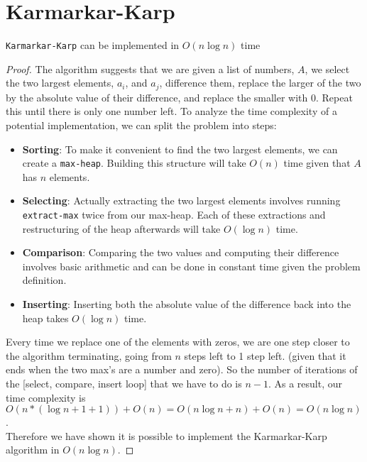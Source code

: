 \documentclass[11pt]{scrartcl}
\theoremstyle{dotlessP}
\theoremstyle{dotlessN}
\theoremstyle{dotN}
\begin{document}
\section{Karmarkar-Karp}
\begin{claim}
    \texttt{Karmarkar-Karp} can be implemented in $O(n\log n)$ time
\end{claim}
\begin{proof}
    The algorithm suggests that we are given a list of numbers, $A$, we select the two largest elements, $a_i$, and $a_j$, difference them, replace the larger of the two by the absolute value of their difference, and replace the smaller with 0. Repeat this until there is only one number left. To analyze the time complexity of a potential implementation, we can split the problem into steps:
    \begin{itemize}
        \item \textbf{Sorting}: To make it convenient to find the two largest elements, we can create a \texttt{max-heap}. Building this structure will take $O(n)$ time given that $A$ has $n$ elements.
        \item \textbf{Selecting}: Actually extracting the two largest elements involves running \texttt{extract-max} twice from our max-heap. Each of these extractions and restructuring of the heap afterwards will take $O(\log n)$ time.
        \item \textbf{Comparison}: Comparing the two values and computing their difference involves basic arithmetic and can be done in constant time given the problem definition. 
        \item \textbf{Inserting}: Inserting both the absolute value of the difference back into the heap takes $O(\log n)$ time. 
    \end{itemize}
    Every time we replace one of the elements with zeros, we are one step closer to the algorithm terminating, going from $n$ steps left to 1 step left. (given that it ends when the two max's are a number and zero). So the number of iterations of the [select, compare, insert loop] that we have to do is $n-1$. As a result, our time complexity is $O(n * (\log n + 1 + 1)) + O(n) = O(n\log n + n) + O(n) = O(n\log n)$.\\

    Therefore we have shown it is possible to implement the Karmarkar-Karp algorithm in $O(n \log n)$.
\end{proof}
\end{document}
